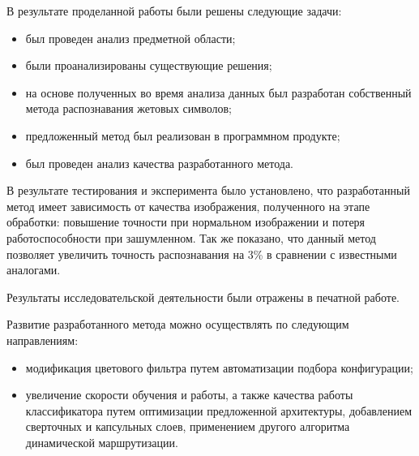 \Conclusion %

В результате проделанной работы были решены следующие задачи:

\begin{itemize}
	\item был проведен анализ предметной области;
	\item были проанализированы существующие решения;
	\item на основе полученных во время анализа данных был разработан собственный метода распознавания жетовых символов;
	\item предложенный метод был реализован в программном продукте;
	\item был проведен анализ качества разработанного метода.
\end{itemize}

В результате тестирования и эксперимента было установлено, что разработанный метод имеет зависимость от качества изображения, полученного на этапе обработки: повышение точности при нормальном изображении и потеря работоспособности при зашумленном. Так же показано, что данный метод позволяет увеличить точность распознавания на 3\% в сравнении с известными аналогами.

Результаты исследовательской деятельности были отражены в печатной работе\cite{Tantsevov}.

Развитие разработанного метода можно осуществлять по следующим направлениям:

\begin{itemize}
	\item модификация цветового фильтра путем автоматизации подбора конфигурации;
	\item увеличение скорости обучения и работы, а также качества работы классификатора путем оптимизации предложенной архитектуры, добавлением сверточных и капсульных слоев, применением другого алгоритма динамической маршрутизации.
\end{itemize}

